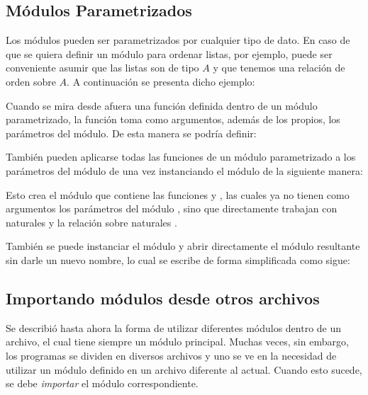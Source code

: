 
\subsection{Módulos Parametrizados}

Los módulos pueden ser parametrizados por cualquier tipo de dato. En caso de que se quiera definir un módulo para ordenar listas, por ejemplo, puede ser conveniente asumir que las listas son de tipo $A$ y que tenemos una relación de orden sobre $A$. A continuación se presenta dicho ejemplo: 




Cuando se mira desde afuera una función definida dentro de un módulo parametrizado, la función toma como argumentos, además de los propios, los parámetros del módulo. De esta manera se podría definir:




También pueden aplicarse todas las funciones de un módulo parametrizado a los parámetros del módulo de una vez instanciando el módulo de la siguiente manera: 




Esto crea el módulo  que contiene las funciones  y , las cuales ya no tienen como argumentos los parámetros del módulo , sino que directamente trabajan con naturales y la relación sobre naturales \AgdaFunction{<}. 




También se puede instanciar el módulo y abrir directamente el módulo resultante sin darle un nuevo nombre, lo cual se escribe de forma simplificada como sigue:




\subsection{Importando módulos desde otros archivos}

Se describió hasta ahora la forma de utilizar diferentes módulos dentro de un archivo, el cual tiene siempre un módulo principal. Muchas veces, sin embargo, los programas se dividen en diversos archivos y uno se ve en la necesidad de utilizar un módulo definido en un archivo diferente al actual. Cuando esto sucede, se debe \textit{importar} el módulo correspondiente.  

